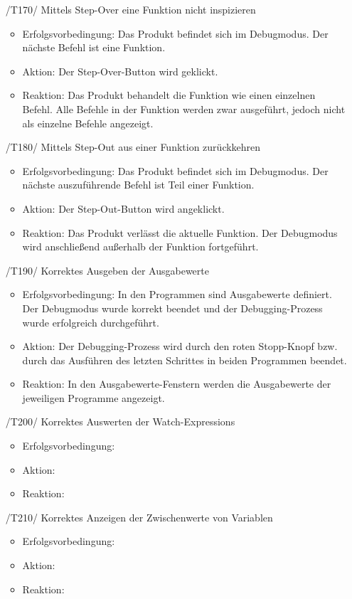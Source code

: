 \documentclass[parskip=full]{scrartcl}
\begin{document}
\begin{itemize}
	\item[/T170/] Mittels \gls{Step-Over} eine Funktion nicht inspizieren
		\begin{itemize}
		\item Erfolgsvorbedingung: Das Produkt befindet sich im Debugmodus. Der nächste Befehl ist eine Funktion.
		\item Aktion: Der Step-Over-Button wird geklickt.
		\item Reaktion:	Das Produkt behandelt die Funktion wie einen einzelnen Befehl. Alle Befehle in der Funktion werden zwar ausgeführt, jedoch nicht als einzelne Befehle angezeigt.
		\end{itemize}	
	
	\item[/T180/] Mittels \gls{Step-Out} aus einer Funktion zurückkehren
		\begin{itemize}
		\item Erfolgsvorbedingung: Das Produkt befindet sich im Debugmodus. Der nächste auszuführende Befehl ist Teil einer Funktion.
		\item Aktion: Der Step-Out-Button wird angeklickt.
		\item Reaktion:	Das Produkt verlässt die aktuelle Funktion. Der Debugmodus wird anschließend außerhalb der Funktion fortgeführt. 	
		\end{itemize}	
	
	\item[/T190/] Korrektes Ausgeben der Ausgabewerte
		\begin{itemize}
		\item Erfolgsvorbedingung: In den Programmen sind Ausgabewerte definiert. Der Debugmodus wurde korrekt beendet und der Debugging-Prozess wurde erfolgreich durchgeführt.
		\item Aktion: Der Debugging-Prozess wird durch den roten Stopp-Knopf bzw. durch das Ausführen des letzten Schrittes in beiden Programmen beendet.
		\item Reaktion:	In den Ausgabewerte-Fenstern werden die Ausgabewerte der jeweiligen Programme angezeigt.	
		\end{itemize}	
	
	\item[/T200/] Korrektes Auswerten der \glspl{Watch-Expression}
		\begin{itemize}
		\item Erfolgsvorbedingung:
		\item Aktion:
		\item Reaktion:		
		\end{itemize}	
	
	\item[/T210/] Korrektes Anzeigen der Zwischenwerte von Variablen
		\begin{itemize}
		\item Erfolgsvorbedingung:
		\item Aktion:
		\item Reaktion:		
		\end{itemize}	
	
	
\end{itemize}
\end{document}
